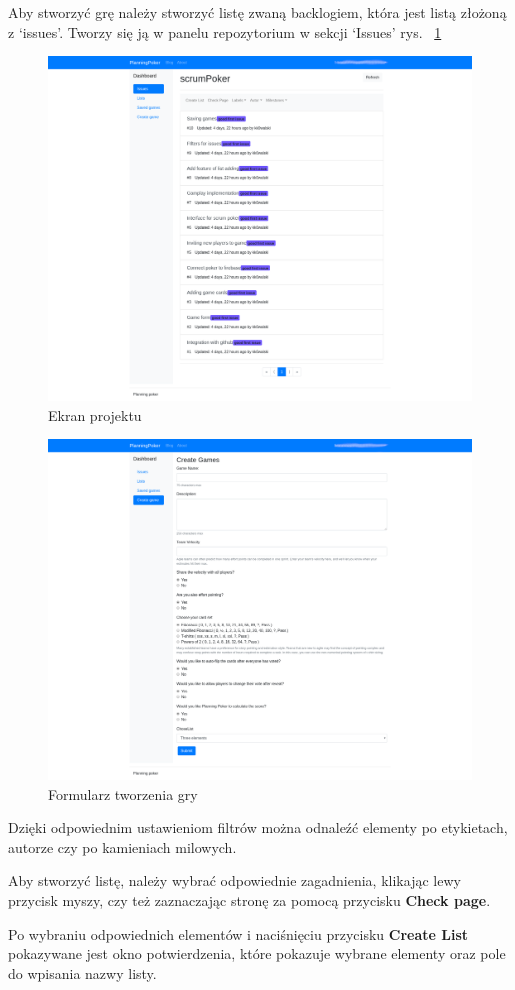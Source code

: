 Aby stworzyć grę należy stworzyć listę zwaną backlogiem, która jest listą złożoną z `issues'.
Tworzy się ją w panelu repozytorium w sekcji `Issues' rys.
~\ref{rys:issues}
\begin{figure}
	\centering\includegraphics[width=.7\textwidth]{img/issues}
	\caption{Ekran projektu}\label{rys:issues}%
\end{figure}
\begin{figure}
	\centering\includegraphics[width=.7\textwidth]{img/Formularz}
	\caption{Formularz tworzenia gry}\label{rys:form}%
\end{figure}

Dzięki odpowiednim ustawieniom filtrów można odnaleźć elementy po etykietach,
autorze czy po kamieniach milowych.

Aby stworzyć listę, należy wybrać odpowiednie zagadnienia, klikając lewy przycisk myszy,
czy też zaznaczając stronę za pomocą przycisku \textbf{Check page}.

Po wybraniu odpowiednich elementów i naciśnięciu przycisku \textbf{Create List}
pokazywane jest okno potwierdzenia,
które pokazuje wybrane elementy oraz pole do wpisania nazwy listy.


